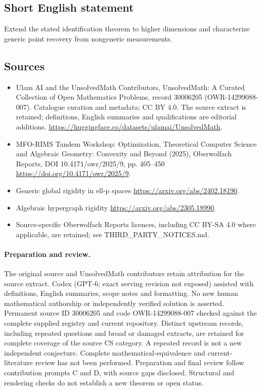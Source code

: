 \documentclass[11pt]{article}
\begin{document}
\subsection{Short English statement}
Extend the stated identification theorem to higher dimensions and characterize generic point recovery from nongeneric measurements.
\subsection{Sources}
\begin{itemize}
\item[\hypertarget{source:30006205:1}{S1}] Ulam AI and the UnsolvedMath Contributors, UnsolvedMath: A Curated Collection of Open Mathematics Problems, record 30006205 (OWR-14299088-007). Catalogue curation and metadata: CC BY 4.0. The source extract is retained; definitions, English summaries and qualifications are editorial additions.
\url{https://huggingface.co/datasets/ulamai/UnsolvedMath}.
\item[\hypertarget{source:30006205:2}{S2}] MFO-RIMS Tandem Workshop: Optimization, Theoretical Computer Science and Algebraic Geometry: Convexity and Beyond (2025), Oberwolfach Reports, DOI 10.4171/owr/2025/9, pp. 405--450
\url{https://doi.org/10.4171/owr/2025/9}.
\item[\hypertarget{source:30006205:3}{S3}] Generic global rigidity in ell-p spaces
\url{https://arxiv.org/abs/2402.18190}.
\item[\hypertarget{source:30006205:4}{S4}] Algebraic hypergraph rigidity
\url{https://arxiv.org/abs/2305.18990}.
\item Source-specific Oberwolfach Reports licences, including CC BY-SA 4.0 where applicable, are retained; see THIRD\_PARTY\_NOTICES.md.
\end{itemize}
\paragraph{Preparation and review.}
The original source and UnsolvedMath contributors retain attribution for the source extract. Codex (GPT-6; exact serving revision not exposed) assisted with definitions, English summaries, scope notes and formatting. No new human mathematical authorship or independently verified solution is asserted. Permanent source ID 30006205 and code OWR-14299088-007 checked against the complete supplied registry and current repository. Distinct upstream records, including repeated questions and broad or damaged extracts, are retained for complete coverage of the source CS category. A repeated record is not a new independent conjecture. Complete mathematical-equivalence and current-literature review has not been performed. Preparation and final review follow contribution prompts C and D, with source gaps disclosed. Structural and rendering checks do not establish a new theorem or open status.
\label{end:30006205}
\end{document}
